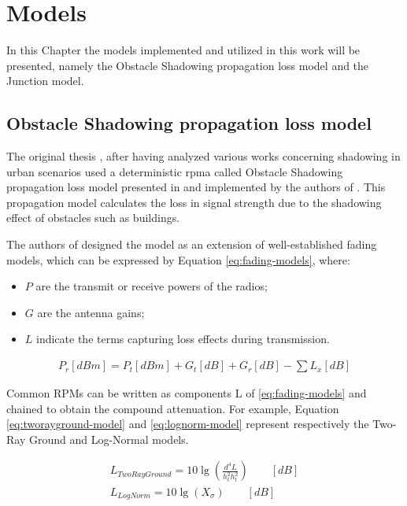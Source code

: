 
\chapter{Models}	
	In this Chapter the models implemented and utilized in this work will be presented, namely the Obstacle Shadowing propagation loss model and the Junction model.
	
	\section{Obstacle Shadowing propagation loss model}
		\label{sec:shadowing}
		The original thesis \cite{ROM2017}, after having analyzed various works concerning shadowing in urban scenarios \cite{Giordano:2010:CST:1860058.1860065} \cite{4020783} used a deterministic \gls{rpma} called Obstacle Shadowing propagation loss model presented in \cite{5720204} and implemented by the authors of \cite{Carpenter:2015:OMI:2756509.2756512}.  This propagation model calculates the loss in signal strength due to the shadowing effect of obstacles such as buildings. 
		
		
		The authors of \cite{5720204} designed the model as an extension of well-established fading models, which can be expressed by Equation \ref{eq:fading-models}, where:
		\begin{itemize}
			\item $P$ are the transmit or receive powers of the radios;
			\item $G$ are the antenna gains;
			\item $L$ indicate the terms capturing loss effects during transmission.
		\end{itemize}
		
		\begin{gather}
			P_r[dBm] = P_t[dBm] + G_t[dB] + G_r[dB] - \sum L_x[dB] 														\label{eq:fading-models}
		\end{gather}
	
		Common RPMs can be written as components L of \ref{eq:fading-models} and chained to obtain the compound attenuation. For example, Equation \ref{eq:tworayground-model} and \ref{eq:lognorm-model} represent respectively the Two-Ray Ground and Log-Normal models.

		\begin{gather}
			L_{TwoRayGround} = 10 \lg \left( \frac{d^4 L}{h^2_t h^2_t} \right)	\qquad [dB]		\label{eq:tworayground-model} \\
			L_{LogNorm} = 10 \lg \left( X_\sigma \right)	\qquad [dB]													\label{eq:lognorm-model}
		\end{gather}
		
